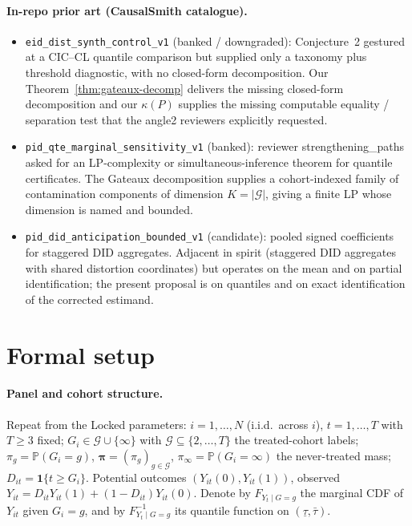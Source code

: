 \documentclass[11pt]{article}
\renewcommand{\Pr}{\mathbb{P}}
\newcommand{\one}{\mathbf{1}}
\theoremstyle{definition}
\theoremstyle{plain}
\theoremstyle{remark}
\begin{document}
\paragraph{In-repo prior art (CausalSmith catalogue).}
\begin{itemize}
  \item \texttt{eid\_dist\_synth\_control\_v1} (banked / downgraded): Conjecture~2 gestured at a CIC--CL quantile comparison but supplied only a taxonomy plus threshold diagnostic, with no closed-form decomposition. Our Theorem~\ref{thm:gateaux-decomp} delivers the missing closed-form decomposition and our $\kappa(P)$ supplies the missing computable equality / separation test that the angle2 reviewers explicitly requested.
  \item \texttt{pid\_qte\_marginal\_sensitivity\_v1} (banked): reviewer strengthening\_paths asked for an LP-complexity or simultaneous-inference theorem for quantile certificates. The Gateaux decomposition supplies a cohort-indexed family of contamination components of dimension $K = |\mathcal{G}|$, giving a finite LP whose dimension is named and bounded.
  \item \texttt{pid\_did\_anticipation\_bounded\_v1} (candidate): pooled signed coefficients for staggered DID aggregates. Adjacent in spirit (staggered DID aggregates with shared distortion coordinates) but operates on the mean and on partial identification; the present proposal is on quantiles and on exact identification of the corrected estimand.
\end{itemize}

\section{Formal setup}
\label{sec:setup}

\paragraph{Panel and cohort structure.} Repeat from the Locked parameters: $i=1,\dots,N$ (i.i.d.\ across $i$), $t=1,\dots,T$ with $T \geq 3$ fixed; $G_i \in \mathcal{G} \cup \{\infty\}$ with $\mathcal{G} \subseteq \{2,\dots,T\}$ the treated-cohort labels; $\pi_g = \Pr(G_i = g)$, $\boldsymbol\pi = (\pi_g)_{g\in\mathcal{G}}$, $\pi_\infty = \Pr(G_i = \infty)$ the never-treated mass; $D_{it} = \one\{t \geq G_i\}$. Potential outcomes $(Y_{it}(0), Y_{it}(1))$, observed $Y_{it} = D_{it} Y_{it}(1) + (1-D_{it}) Y_{it}(0)$. Denote by $F_{Y_t \mid G=g}$ the marginal CDF of $Y_{it}$ given $G_i = g$, and by $F^{-1}_{Y_t \mid G=g}$ its quantile function on $(\underline\tau, \bar\tau)$.
\end{document}
